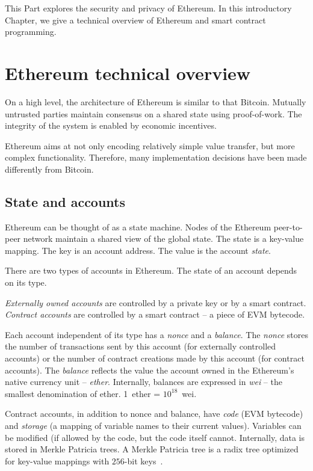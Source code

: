 This Part explores the security and privacy of Ethereum.
In this introductory Chapter, we give a technical overview of Ethereum and smart contract programming.



\section{Ethereum technical overview}

On a high level, the architecture of Ethereum is similar to that Bitcoin.
Mutually untrusted parties maintain consensus on a shared state using proof-of-work.
The integrity of the system is enabled by economic incentives.

Ethereum aims at not only encoding relatively simple value transfer, but more complex functionality.
Therefore, many implementation decisions have been made differently from Bitcoin.


\subsection{State and accounts}

Ethereum can be thought of as a state machine.
Nodes of the Ethereum peer-to-peer network maintain a shared view of the global state.
The state is a key-value mapping.
The key is an account address.
The value is the account \textit{state}.

There are two types of accounts in Ethereum.
The state of an account depends on its type.

\emph{Externally owned accounts} are controlled by a private key or by a smart contract.
\emph{Contract accounts} are controlled by a smart contract -- a piece of EVM bytecode.

Each account independent of its type has a \textit{nonce} and a \textit{balance}.
The \emph{nonce} stores the number of transactions sent by this account (for externally controlled accounts) or the number of contract creations made by this account (for contract accounts).
The \emph{balance} reflects the value the account owned in the Ethereum's native currency unit -- \textit{ether}.
Internally, balances are expressed in \emph{wei} -- the smallest denomination of ether.
1~ether = $10^{18}$~wei.

Contract accounts, in addition to nonce and balance, have \textit{code} (EVM bytecode) and \textit{storage} (a mapping of variable names to their current values).
Variables can be modified (if allowed by the code, but the code itself cannot.
Internally, data is stored in Merkle Patricia trees.
A Merkle Patricia tree is a radix tree optimized for key-value mappings with $256$-bit keys~\cite{MPTSpec, Buchman14}.


